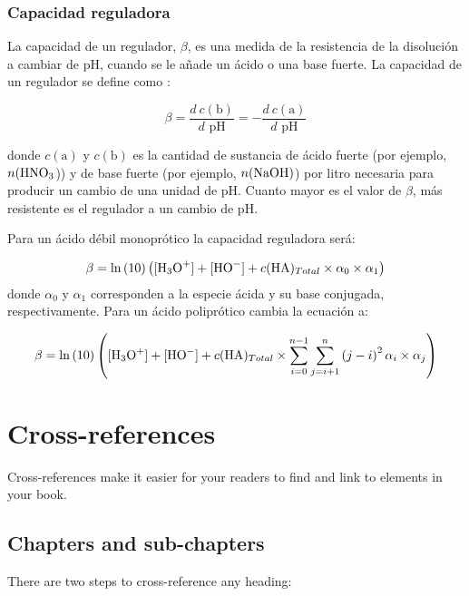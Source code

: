 \documentclass[
]{book}
\theoremstyle{definition}
\theoremstyle{definition}
\theoremstyle{definition}
\theoremstyle{definition}
\theoremstyle{remark}
\begin{document}
\hypertarget{capacidad-reguladora}{%
\subsection{Capacidad reguladora}\label{capacidad-reguladora}}

La capacidad de un regulador, \(\beta\), es una medida de la resistencia de la disolución a cambiar de pH, cuando se le añade un ácido o una base fuerte. La capacidad de un regulador se define como \citep{VanSlyke1922}:

\[\beta = \frac{d\ c(\text{b})}{d \text{ pH}} = - \frac{d\ c(\text{a})}{d \text{ pH}}\]

donde \(c(\text{a})\) y \(c(\text{b})\) es la cantidad de sustancia de ácido fuerte (por ejemplo, \(n(\ce{HNO3}\))) y de base fuerte (por ejemplo, \(n(\ce{NaOH})\)) por litro necesaria para producir un cambio de una unidad de pH. Cuanto mayor es el valor de \(\beta\), más resistente es el regulador a un cambio de pH.

Para un ácido débil monoprótico la capacidad reguladora será:

\[\beta = \ln\left(10\right) \left([\ce{H3O+}] +[\ce{HO-}] + c(\ce{HA})_{Total} \times \alpha_0 \times \alpha_1 \right) \]
donde \(\alpha_0\) y \(\alpha_1\) corresponden a la especie ácida y su base conjugada, respectivamente. Para un ácido poliprótico cambia la ecuación a:

\[\beta = \ln\left(10\right) \left([\ce{H3O+}] + [\ce{HO-}] + c(\ce{HA})_{Total} \times \sum_{i=0}^{n-1} \sum_{j = i+1}^n \left(j-i\right)^2 \alpha_i \times \alpha_j \right) \]

\hypertarget{cross}{%
\chapter{Cross-references}\label{cross}}

Cross-references make it easier for your readers to find and link to elements in your book.

\hypertarget{chapters-and-sub-chapters}{%
\section{Chapters and sub-chapters}\label{chapters-and-sub-chapters}}

There are two steps to cross-reference any heading:
\end{document}
